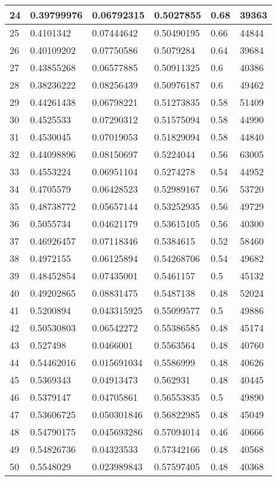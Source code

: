 \begin{longtable}{|l|l|l|l|l|l|}
24 & 0.39799976 & 0.06792315 & 0.5027855 & 0.68 & 39363 \\ \hline 
25 & 0.4101342 & 0.07444642 & 0.50490195 & 0.66 & 44844 \\ \hline 
26 & 0.40109202 & 0.07750586 & 0.5079284 & 0.64 & 39684 \\ \hline 
27 & 0.43855268 & 0.06577885 & 0.50911325 & 0.6 & 40386 \\ \hline 
28 & 0.38236222 & 0.08256439 & 0.50976187 & 0.6 & 49462 \\ \hline 
29 & 0.44261438 & 0.06798221 & 0.51273835 & 0.58 & 51409 \\ \hline 
30 & 0.4525533 & 0.07290312 & 0.51575094 & 0.58 & 44990 \\ \hline 
31 & 0.4530045 & 0.07019053 & 0.51829094 & 0.58 & 44840 \\ \hline 
32 & 0.44098896 & 0.08150697 & 0.5224044 & 0.56 & 63005 \\ \hline 
33 & 0.4553224 & 0.06951104 & 0.5274278 & 0.54 & 44952 \\ \hline 
34 & 0.4705579 & 0.06428523 & 0.52989167 & 0.56 & 53720 \\ \hline 
35 & 0.48738772 & 0.05657144 & 0.53252935 & 0.56 & 49729 \\ \hline 
36 & 0.5055734 & 0.04621179 & 0.53615105 & 0.56 & 40300 \\ \hline 
37 & 0.46926457 & 0.07118346 & 0.5384615 & 0.52 & 58460 \\ \hline 
38 & 0.4972155 & 0.06125894 & 0.54268706 & 0.54 & 49682 \\ \hline 
39 & 0.48452854 & 0.07435001 & 0.5461157 & 0.5 & 45132 \\ \hline 
40 & 0.49202865 & 0.08831475 & 0.5487138 & 0.48 & 52024 \\ \hline 
41 & 0.5200894 & 0.043315925 & 0.55099577 & 0.5 & 49886 \\ \hline 
42 & 0.50530803 & 0.06542272 & 0.55386585 & 0.48 & 45174 \\ \hline 
43 & 0.527498 & 0.0466001 & 0.5563564 & 0.48 & 40760 \\ \hline 
44 & 0.54462016 & 0.015691034 & 0.5586999 & 0.48 & 40626 \\ \hline 
45 & 0.5369343 & 0.04913473 & 0.562931 & 0.48 & 40445 \\ \hline 
46 & 0.5379147 & 0.04705861 & 0.56553835 & 0.5 & 49890 \\ \hline 
47 & 0.53606725 & 0.050301846 & 0.56822985 & 0.48 & 45049 \\ \hline 
48 & 0.54790175 & 0.045693286 & 0.57094014 & 0.46 & 40666 \\ \hline 
49 & 0.54826736 & 0.04323533 & 0.57342166 & 0.48 & 40568 \\ \hline 
50 & 0.5548029 & 0.023989843 & 0.57597405 & 0.48 & 40368 \\ \hline 
\end{longtable}